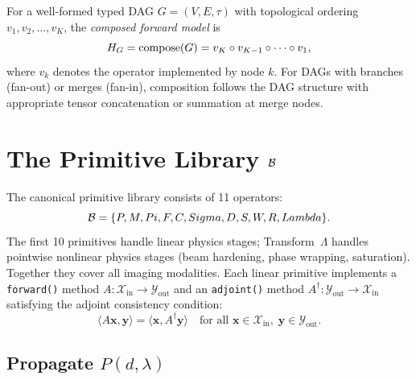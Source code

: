 \documentclass[11pt]{article}
\begin{document}
\begin{definition}[Compose]
\label{def:compose}
For a well-formed typed DAG $G = (V, E, \tau)$ with topological ordering $v_1, v_2, \ldots, v_K$, the \emph{composed forward model} is
\begin{equation}
  H_{G} = \mathrm{compose}(G) = v_K \circ v_{K-1} \circ \cdots \circ v_1,
  \label{eq:compose}
\end{equation}
where $v_k$ denotes the operator implemented by node $k$. For DAGs with branches (fan-out) or merges (fan-in), composition follows the DAG structure with appropriate tensor concatenation or summation at merge nodes.
\end{definition}


\section{The Primitive Library \texorpdfstring{$\mathcal{B}$}{B}}
\label{sec:primitives}

The canonical primitive library consists of 11 operators:
\begin{equation}
  \mathcal{B} = \{P, M, Pi, F, C, Sigma, D, S, W, R, Lambda\}.
\end{equation}
The first 10 primitives handle linear physics stages; Transform~$\Lambda$ handles pointwise nonlinear physics stages (beam hardening, phase wrapping, saturation). Together they cover all imaging modalities.
Each linear primitive implements a \texttt{forward()} method $A: \mathcal{X}_{\mathrm{in}} \to \mathcal{Y}_{\mathrm{out}}$ and an \texttt{adjoint()} method $A^\dagger: \mathcal{Y}_{\mathrm{out}} \to \mathcal{X}_{\mathrm{in}}$ satisfying the adjoint consistency condition:
\begin{equation}
  \langle A\mathbf{x}, \mathbf{y} \rangle = \langle \mathbf{x}, A^\dagger \mathbf{y} \rangle
  \quad \text{for all } \mathbf{x} \in \mathcal{X}_{\mathrm{in}},\; \mathbf{y} \in \mathcal{Y}_{\mathrm{out}}.
  \label{eq:adjoint}
\end{equation}

\subsection{Propagate \texorpdfstring{$P(d, \lambda)$}{P(d, lambda)}}
\end{document}
